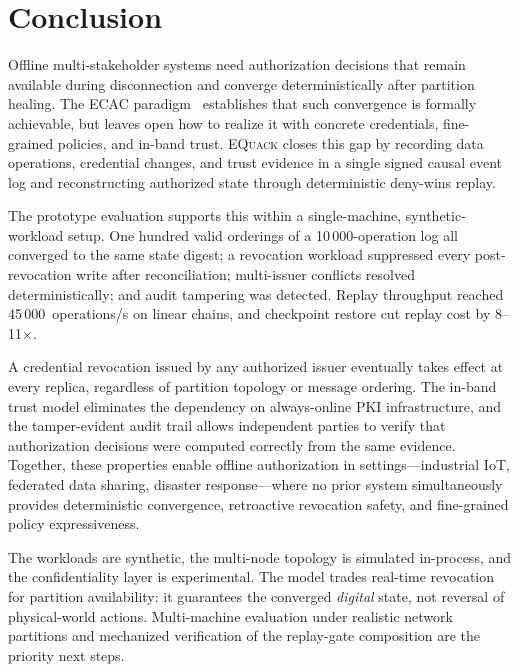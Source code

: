 \documentclass[10pt,journal,compsoc]{IEEEtran}
\newcommand{\equack}{\textsc{EQuack}}
\begin{document}
\section{Conclusion}
\label{sec:conclusion}

Offline multi-stakeholder systems need authorization decisions that remain available during disconnection and converge deterministically after partition healing. The ECAC paradigm~\cite{jacob2024eventuallyac} establishes that such convergence is formally achievable, but leaves open how to realize it with concrete credentials, fine-grained policies, and in-band trust. \equack{} closes this gap by recording data operations, credential changes, and trust evidence in a single signed causal event log and reconstructing authorized state through deterministic deny-wins replay.

The prototype evaluation supports this within a single-machine, synthetic-workload setup. One hundred valid orderings of a 10\,000-operation log all converged to the same state digest; a revocation workload suppressed every post-revocation write after reconciliation; multi-issuer conflicts resolved deterministically; and audit tampering was detected. Replay throughput reached 45\,000~operations/s on linear chains, and checkpoint restore cut replay cost by 8--11$\times$.

A credential revocation issued by any authorized issuer eventually takes effect at every replica, regardless of partition topology or message ordering. The in-band trust model eliminates the dependency on always-online PKI infrastructure, and the tamper-evident audit trail allows independent parties to verify that authorization decisions were computed correctly from the same evidence. Together, these properties enable offline authorization in settings---industrial IoT, federated data sharing, disaster response---where no prior system simultaneously provides deterministic convergence, retroactive revocation safety, and fine-grained policy expressiveness.

The workloads are synthetic, the multi-node topology is simulated in-process, and the confidentiality layer is experimental. The model trades real-time revocation for partition availability: it guarantees the converged \emph{digital} state, not reversal of physical-world actions. Multi-machine evaluation under realistic network partitions and mechanized verification of the replay-gate composition are the priority next steps.



\end{document}
